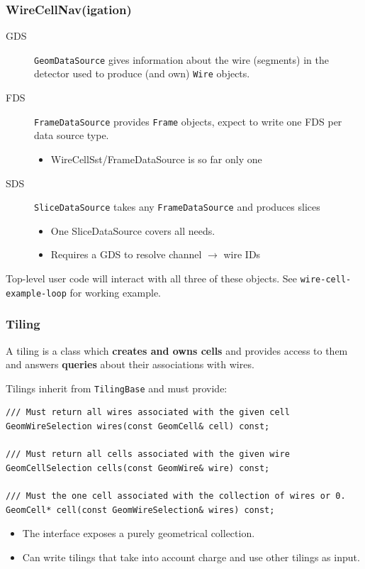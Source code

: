 \documentclass[xcolor=dvipsnames]{beamer}
\begin{document}
\begin{frame}
  \frametitle{WireCellNav(igation)}
  \begin{description}
  \item[GDS] \texttt{GeomDataSource} gives information about the wire (segments) in the
    detector used to produce (and own) \texttt{Wire} objects.
  \item[FDS] \texttt{FrameDataSource} provides \texttt{Frame} objects, expect to
    write one FDS per data source type.
    \begin{itemize}
    \item WireCellSst/FrameDataSource is so far only one
    \end{itemize}
  \item[SDS] \texttt{SliceDataSource} takes any \texttt{FrameDataSource} and
    produces slices
    \begin{itemize}
    \item One SliceDataSource covers all needs.
    \item Requires a GDS to resolve channel $\rightarrow$ wire IDs
    \end{itemize}
  \end{description}
  Top-level user code will interact with all three of these objects.
  See \texttt{wire-cell-example-loop} for working example.
\end{frame}

\begin{frame}[fragile]
  \frametitle{Tiling}

  A tiling is a class which \textbf{creates and owns cells} and provides access to
  them and answers \textbf{queries} about their associations with wires.

  \vspace{2mm}

  Tilings inherit from \texttt{TilingBase} and must provide:

  \begin{lstlisting}
/// Must return all wires associated with the given cell
GeomWireSelection wires(const GeomCell& cell) const;
	
/// Must return all cells associated with the given wire
GeomCellSelection cells(const GeomWire& wire) const;

/// Must the one cell associated with the collection of wires or 0.
GeomCell* cell(const GeomWireSelection& wires) const;
  \end{lstlisting}

  \scriptsize 
  \begin{itemize}
  \item The interface exposes a purely geometrical collection.  
  \item Can write tilings that take into account charge and use other tilings as input.
  \end{itemize}
\end{frame}
\end{document}
